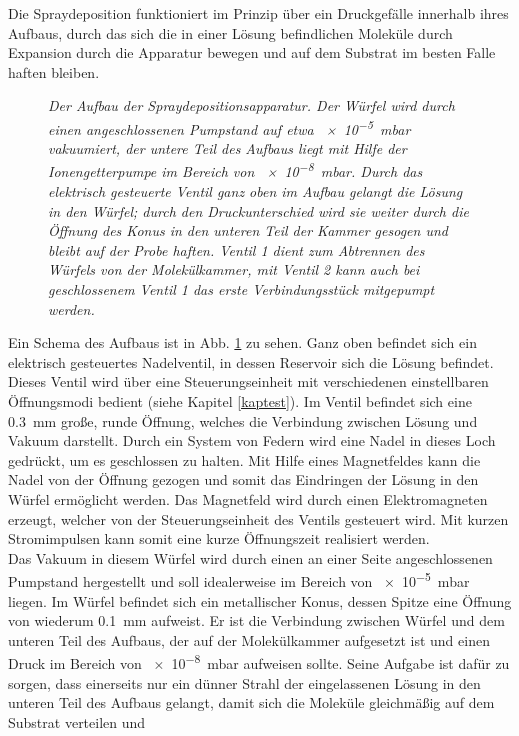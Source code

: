  Die Spraydeposition funktioniert im Prinzip über ein Druckgefälle innerhalb ihres
Aufbaus, durch das sich die in einer Lösung befindlichen Moleküle durch Expansion durch die
Apparatur bewegen und auf dem Substrat im besten Falle haften bleiben. 
\\
\begin{figure}
\centering
\sffamily

\caption{\textit{Der Aufbau der Spraydepositionsapparatur.
Der Würfel wird durch einen angeschlossenen Pumpstand auf etwa \SI{e-5}{mbar} vakuumiert, der untere
Teil des Aufbaus liegt mit Hilfe der Ionengetterpumpe im Bereich von \SI{e-8}{mbar}. Durch das
elektrisch gesteuerte Ventil ganz oben im Aufbau gelangt die Lösung in den Würfel; durch den
Druckunterschied wird sie weiter durch die Öffnung des Konus in den unteren Teil der Kammer gesogen
und bleibt auf der Probe haften. Ventil 1 dient zum Abtrennen des Würfels von der Molekülkammer, mit
Ventil 2 kann auch bei geschlossenem Ventil 1 das erste Verbindungsstück mitgepumpt werden.
}}
\label{sbaufbau}
\end{figure}
Ein Schema des Aufbaus ist in Abb. \ref{sbaufbau} zu sehen. Ganz oben befindet sich ein elektrisch
gesteuertes Nadelventil, in dessen Reservoir sich die Lösung befindet. Dieses Ventil wird über eine
Steuerungseinheit mit verschiedenen einstellbaren Öffnungsmodi bedient (siehe Kapitel
\ref{kaptest}).
Im Ventil befindet sich eine \SI{0,3}{mm} große, runde Öffnung, welches die Verbindung zwischen
Lösung und Vakuum darstellt. Durch ein System von Federn wird eine Nadel in dieses Loch gedrückt, um
es geschlossen zu halten.
Mit Hilfe eines Magnetfeldes kann die Nadel von der Öffnung gezogen und somit das Eindringen der
Lösung in den Würfel ermöglicht werden. 
Das Magnetfeld wird durch einen Elektromagneten erzeugt, welcher von der Steuerungseinheit des
Ventils gesteuert wird. Mit kurzen Stromimpulsen kann somit eine kurze Öffnungszeit realisiert
werden.
\\
Das Vakuum in diesem Würfel wird durch einen an einer Seite angeschlossenen Pumpstand hergestellt
und soll idealerweise im Bereich von \SI{e-5}{mbar} liegen. Im Würfel befindet sich ein metallischer
Konus, dessen Spitze eine Öffnung von wiederum \SI{0,1}{mm} aufweist. Er ist die Verbindung zwischen
Würfel und dem unteren Teil des Aufbaus, der auf der Molekülkammer aufgesetzt ist und einen Druck im Bereich von
\SI{e-8}{mbar} aufweisen sollte.  
Seine Aufgabe ist dafür zu sorgen, dass einerseits nur ein dünner Strahl der eingelassenen Lösung in
den unteren Teil des Aufbaus gelangt, damit sich die Moleküle gleichmäßig auf dem Substrat verteilen und
